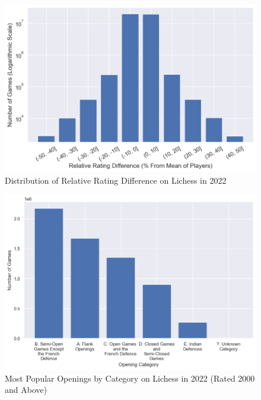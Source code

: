 \documentclass[a4paper, 11pt]{article}
\begin{document}
\begin{appendices}
\begin{figure}[H]
    \centering
    \caption{Distribution of Relative Rating Difference on Lichess in 2022}
    \label{fig:distributionOfRelativeRatingDifference}
    \includegraphics[width=\textwidth]{Distribution of Relative Rating Difference.png}
\end{figure}

\begin{figure}[H]
    \centering
    \caption{Most Popular Openings by Category on Lichess in 2022 (Rated 2000 and Above)}
    \label{fig:mostPopularOpeningsByCategoryRated2000Plus}
    \includegraphics[width=\textwidth]{Most Popular Openings by Category (Rated 2000+).png}
\end{figure}


\end{appendices}
\end{document}
